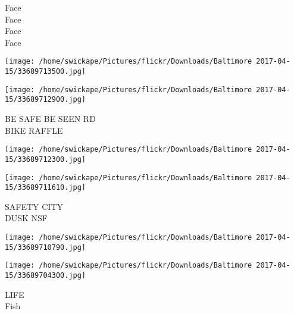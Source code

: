 \documentclass[10pt,letterpaper]{article}
\begin{document}
Face\\
Face\\
Face\\
Face
\pagebreak

\texttt{[image: /home/swickape/Pictures/flickr/Downloads/Baltimore 2017-04-15/33689713500.jpg]}

\vspace{0.25in}
\texttt{[image: /home/swickape/Pictures/flickr/Downloads/Baltimore 2017-04-15/33689712900.jpg]}

BE SAFE BE SEEN RD\\
BIKE RAFFLE
\pagebreak

\texttt{[image: /home/swickape/Pictures/flickr/Downloads/Baltimore 2017-04-15/33689712300.jpg]}

\vspace{0.25in}
\texttt{[image: /home/swickape/Pictures/flickr/Downloads/Baltimore 2017-04-15/33689711610.jpg]}

SAFETY CITY\\
DUSK NSF
\pagebreak

\texttt{[image: /home/swickape/Pictures/flickr/Downloads/Baltimore 2017-04-15/33689710790.jpg]}

\vspace{0.25in}
\texttt{[image: /home/swickape/Pictures/flickr/Downloads/Baltimore 2017-04-15/33689704300.jpg]}

LIFE\\
Fish
\pagebreak
\end{document}
